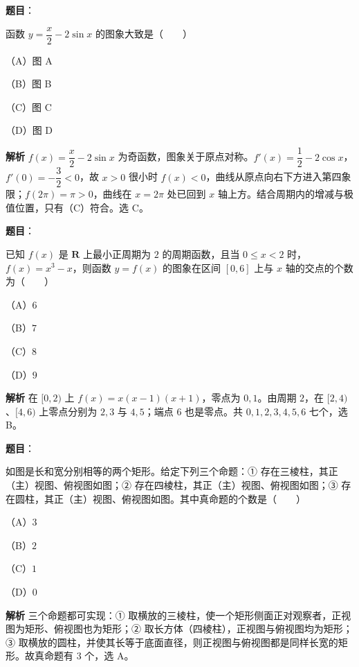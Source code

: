 \begin{answer}

\textbf{题目}：

函数 $y=\dfrac x2-2\sin x$ 的图象大致是\mbox{（　　）}

（A）图 A

（B）图 B

（C）图 C

（D）图 D
\nopagebreak[4]
\begin{center}\end{center}
\nopagebreak[4]
\textbf{解析}
$f(x)=\dfrac x2-2\sin x$ 为奇函数，图象关于原点对称。$f'(x)=\dfrac12-2\cos x$，$f'(0)=-\dfrac32<0$，故 $x>0$ 很小时 $f(x)<0$，曲线从原点向右下方进入第四象限；$f(2\pi)=\pi>0$，曲线在 $x=2\pi$ 处已回到 $x$ 轴上方。结合周期内的增减与极值位置，只有（C）符合。选 C。


\end{answer}
\begin{answer}

\textbf{题目}：

已知 $f(x)$ 是 $\mathbf R$ 上最小正周期为 $2$ 的周期函数，且当 $0\leqslant x<2$ 时，$f(x)=x^3-x$，则函数 $y=f(x)$ 的图象在区间 $[0,6]$ 上与 $x$ 轴的交点的个数为\mbox{（　　）}

（A）$6$

（B）$7$

（C）$8$

（D）$9$

\textbf{解析}
在 $[0,2)$ 上 $f(x)=x(x-1)(x+1)$，零点为 $0,1$。由周期 $2$，在 $[2,4)$、$[4,6)$ 上零点分别为 $2,3$ 与 $4,5$；端点 $6$ 也是零点。共 $0,1,2,3,4,5,6$ 七个，选 B。


\end{answer}
\begin{answer}

\textbf{题目}：

如图是长和宽分别相等的两个矩形。给定下列三个命题：① 存在三棱柱，其正（主）视图、俯视图如图；② 存在四棱柱，其正（主）视图、俯视图如图；③ 存在圆柱，其正（主）视图、俯视图如图。其中真命题的个数是\mbox{（　　）}

（A）$3$

（B）$2$

（C）$1$

（D）$0$
\nopagebreak[4]
\begin{center}\end{center}
\nopagebreak[4]
\textbf{解析}
三个命题都可实现：① 取横放的三棱柱，使一个矩形侧面正对观察者，正视图为矩形、俯视图也为矩形；② 取长方体（四棱柱），正视图与俯视图均为矩形；③ 取横放的圆柱，并使其长等于底面直径，则正视图与俯视图都是同样长宽的矩形。故真命题有 $3$ 个，选 A。


\end{answer}

